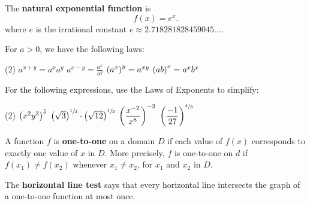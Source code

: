 \documentclass[../mathNotesPreamble]{subfiles}
\begin{document}
  \begin{defn*}
    The \textbf{natural exponential function} is 
      \[f(x)=e^x.\]
    where $e$ is the irrational constant $e\approx2.718281828459045\dots$.
  \end{defn*}
  \pagebreak
  
  \begin{thmBox*}
    For $a>0$, we have the following laws:
    \begin{tasks}(2)
      \task $a^{x+y}=a^xa^y$
      \task $a^{x-y}=\frac{a^x}{a^y}$
      \task $\parens{a^x}^y=a^{xy}$
      \task $\parens{ab}^x=a^xb^x$
    \end{tasks}
  \end{thmBox*}

  \begin{ex*}
    For the following expressions, use the Laws of Exponents to simplify:
  \end{ex*}
  \begin{tasks}[after-item-skip=\stretch{1}](2)
    \task $\parens{x^2y^3}^5$
    \task $\parens{\sqrt 3}^{\sfrac{1}{2}}\cdot\parens{\sqrt{12}}^{\sfrac{1}{2}}$
    \task $\parens{\dfrac{x\inv[2]}{x^8}}\inv[2]$
    \task $\parens{\dfrac{-1}{27}}^{\sfrac{4}{3}}$
  \end{tasks}
  \pagebreak
  
  \begin{defn*}
    A function $f$ is \textbf{one-to-one} on a domain $D$ if each value of $f(x)$ corresponds to exactly one value of $x$ in $D$. More precisely, $f$ is one-to-one on $d$ if $f(x_1)\neq f(x_2)$ whenever $x_1\neq x_2$, for $x_1$ and $x_2$ in $D$. 
    
    The \textbf{horizontal line test} says that every horizontal line intersects the graph of a one-to-one function at most once.
  \end{defn*}
\end{document}
